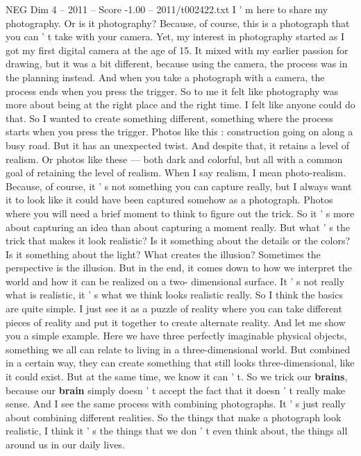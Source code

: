 \begin{textsample}{NEG Dim 4 – 2011 – Score -1.00 – 2011/t002422.txt}  \label{ex:f4_neg_008}
I ' m here to share my photography.
Or is it photography?
Because, of course, this is a photograph that you can ' t take with your camera.
Yet, my interest in photography started as I got my first digital camera at the age of 15.
It mixed with my earlier passion for drawing, but it was a bit different, because using the camera, the process was in the planning instead.
And when you take a photograph with a camera, the process ends when you press the trigger.
So to me it felt like photography was more about being at the right place and the right time.
I felt like anyone could do that.
So I wanted to create something different, something where the process starts when you press the trigger.
Photos like this : construction going on along a busy road.
But it has an unexpected twist.
And despite that, it retains a level of realism.
Or photos like these — both dark and colorful, but all with a common goal of retaining the level of realism.
When I say realism, I mean photo-realism.
Because, of course, it ' s not something you can capture really, but I always want it to look like it could have been captured somehow as a photograph.
Photos where you will need a brief moment to think to figure out the trick.
So it ' s more about capturing an idea than about capturing a moment really.
But what ' s the trick that makes it look realistic?
Is it something about the details or the colors?
Is it something about the light?
What creates the illusion?
Sometimes the perspective is the illusion.
But in the end, it comes down to how we interpret the world and how it can be realized on a two- dimensional surface.
It ' s not really what is realistic, it ' s what we think looks realistic really.
So I think the basics are quite simple.
I just see it as a puzzle of reality where you can take different pieces of reality and put it together to create alternate reality.
And let me show you a simple example.
Here we have three perfectly imaginable physical objects, something we all can relate to living in a three-dimensional world.
But combined in a certain way, they can create something that still looks three-dimensional, like it could exist.
But at the same time, we know it can ' t.
So we trick our \textbf{brains}, because our \textbf{brain} simply doesn ' t accept the fact that it doesn ' t really make sense.
And I see the same process with combining photographs.
It ' s just really about combining different realities.
So the things that make a photograph look realistic, I think it ' s the things that we don ' t even think about, the things all around us in our daily lives.

\end{textsample}

